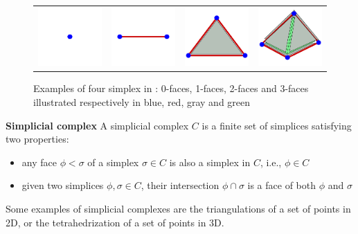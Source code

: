 \begin{figure}[t]
\centering
\begin{tabular}{cccc}
\includegraphics[width=0.25\columnwidth]{./img/simplex01}&
\includegraphics[width=0.25\columnwidth]{./img/simplex02}&
\includegraphics[width=0.25\columnwidth]{./img/simplex03}&
\includegraphics[width=0.25\columnwidth]{./img/simplex04}
\end{tabular}
\caption{Examples of four simplex in \Rthree: 0-faces, 1-faces, 2-faces and 3-faces illustrated respectively in blue, red, gray and green}
\label{fig:simplices}
\end{figure}


\begin{mydef}
\textbf{Simplicial complex}
A simplicial complex $C$ is a finite set of simplices satisfying two properties:
\begin{itemize}
  \item any face $\phi < \sigma$ of a simplex $\sigma \in C$ is also a simplex in $C$, i.e., $\phi \in C$
  \item given two simplices $\phi, \sigma \in C$, their intersection $\phi \cap \sigma$ is a face of both $\phi$ and $\sigma$
\end{itemize}
\end{mydef}
Some examples of simplicial complexes are the triangulations of a set of points in 2D, or the tetrahedrization of a set of points in 3D.

